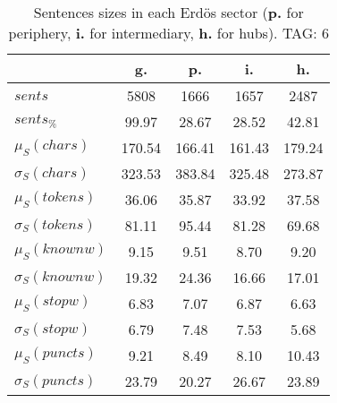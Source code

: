 \begin{table}[h!]
\begin{center}
\begin{tabular}{| l | c | c | c | c |}\hline
 & g. & p. & i. & h. \\\hline
$sents$ & 5808  & 1666  & 1657  & 2487 \\\hline
$sents_{\%}$ & 99.97  & 28.67  & 28.52  & 42.81 \\\hline
$\mu_S(chars)$ & 170.54  & 166.41  & 161.43  & 179.24 \\\hline
$\sigma_S(chars)$ & 323.53  & 383.84  & 325.48  & 273.87 \\\hline
$\mu_S(tokens)$ & 36.06  & 35.87  & 33.92  & 37.58 \\\hline
$\sigma_S(tokens)$ & 81.11  & 95.44  & 81.28  & 69.68 \\\hline
$\mu_S(knownw)$ & 9.15  & 9.51  & 8.70  & 9.20 \\\hline
$\sigma_S(knownw)$ & 19.32  & 24.36  & 16.66  & 17.01 \\\hline
$\mu_S(stopw)$ & 6.83  & 7.07  & 6.87  & 6.63 \\\hline
$\sigma_S(stopw)$ & 6.79  & 7.48  & 7.53  & 5.68 \\\hline
$\mu_S(puncts)$ & 9.21  & 8.49  & 8.10  & 10.43 \\\hline
$\sigma_S(puncts)$ & 23.79  & 20.27  & 26.67  & 23.89 \\\hline
\end{tabular}
\caption{Sentences sizes in each Erd\"os sector ({{\bf p.}} for periphery, {{\bf i.}} for intermediary, {{\bf h.}} for hubs). TAG: 6}
\end{center}
\end{table}